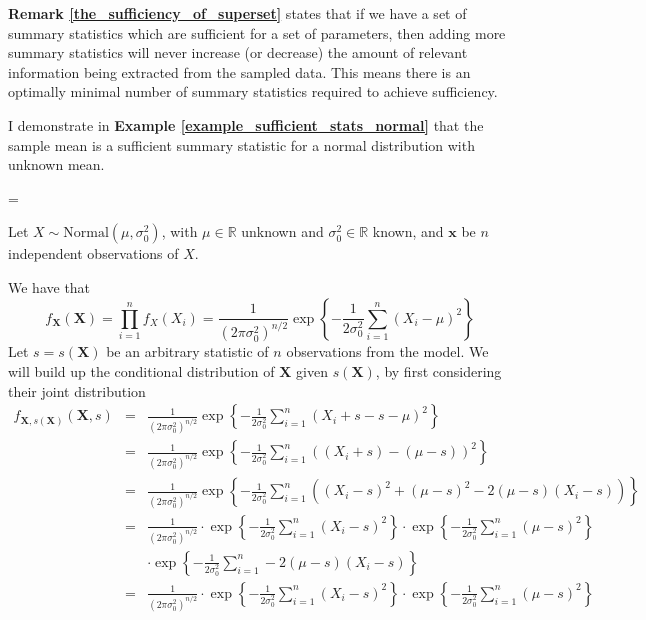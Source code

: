 \documentclass[11pt,a4paper]{article}
\theoremstyle{break}
\begin{document}
  \par \textbf{Remark \ref{the_sufficiency_of_superset}} states that if we have a set of summary statistics which are sufficient for a set of parameters, then adding more summary statistics will never increase (or decrease) the amount of relevant information being extracted from the sampled data. This means there is an optimally minimal number of summary statistics required to achieve sufficiency.

  \par I demonstrate in \textbf{Example \ref{example_sufficient_stats_normal}} that the sample mean is a sufficient summary statistic for a normal distribution with unknown mean.

  \begin{box_example}\label{example_sufficient_stats_normal}
    \everymath={\displaystyle}
    \par\par Let $X\sim\text{Normal}(\mu,\sigma^2_0)$, with $\mu\in\mathbb{R}$ unknown and $\sigma_0^2\in\mathbb{R}$ known, and $\mathbf{x}$ be $n$ independent observations of $X$.
    \par We have that
    \[
      f_{\mathbf{X}}(\mathbf{X})=\prod_{i=1}^nf_X(X_i)=\frac1{(2\pi\sigma_0^2)^{n/2}}\exp\left\{-\frac1{2\sigma_0^2}\sum_{i=1}^n(X_i-\mu)^2\right\}
    \]
    Let $s=s(\mathbf{X})$ be an arbitrary statistic of $n$ observations from the model. We will build up the conditional distribution of $\mathbf{X}$ given $s(\mathbf{X})$, by first considering their joint distribution
    \[\begin{array}{rcl}
      f_{\mathbf{X},s(\mathbf{X})}(\mathbf{X},s)&=&\frac1{(2\pi\sigma_0^2)^{n/2}}\exp\left\{-\frac1{2\sigma_0^2}\sum_{i=1}^n(X_i+s-s-\mu)^2\right\}\\
      &=&\frac1{(2\pi\sigma_0^2)^{n/2}}\exp\left\{-\frac1{2\sigma_0^2}\sum_{i=1}^n((X_i+s)-(\mu-s))^2\right\}\\
      &=&\frac1{(2\pi\sigma_0^2)^{n/2}}\exp\left\{-\frac1{2\sigma_0^2}\sum_{i=1}^n\left((X_i-s)^2+(\mu-s)^2-2(\mu-s)(X_i-s)\right)\right\}\\
      &=&\frac1{(2\pi\sigma_0^2)^{n/2}}\cdot\exp\left\{-\frac1{2\sigma_0^2}\sum_{i=1}^n(X_i-s)^2\right\}\cdot\exp\left\{-\frac1{2\sigma_0^2}\sum_{i=1}^n(\mu-s)^2\right\}\\
      &&\cdot\exp\left\{-\frac1{2\sigma_0^2}\sum_{i=1}^n-2(\mu-s)(X_i-s)\right\}\\
      &=&\frac1{(2\pi\sigma_0^2)^{n/2}}\cdot\exp\left\{-\frac1{2\sigma_0^2}\sum_{i=1}^n(X_i-s)^2\right\}\cdot\exp\left\{-\frac1{2\sigma_0^2}\sum_{i=1}^n(\mu-s)^2\right\}\\

\end{array}\]
\end{box_example}
\end{document}
